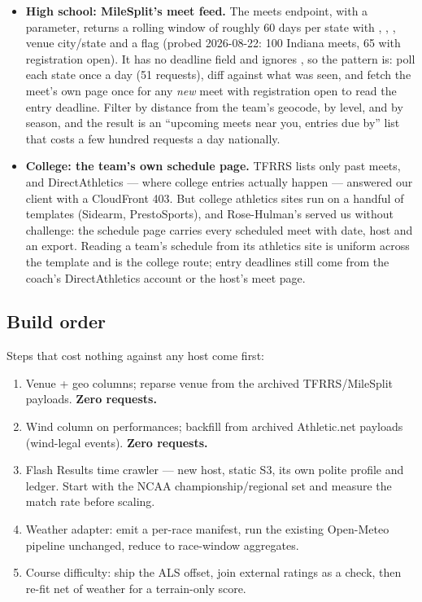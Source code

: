 \begin{itemize}
  \item \textbf{High school: MileSplit's meet feed.} The meets endpoint,
     with a  parameter,
    returns a rolling window of roughly 60 days per state with ,
    , , venue city/state and a
     flag (probed 2026-08-22: 100 Indiana meets,
    65 with registration open). It has no deadline field and ignores
    , so the pattern is: poll each state once a day (51 requests),
    diff against what was seen, and fetch the meet's own page once for any
    \emph{new} meet with registration open to read the entry deadline. Filter
    by distance from the team's geocode, by level, and by season, and the
    result is an ``upcoming meets near you, entries due by'' list that costs
    a few hundred requests a day nationally.
  \item \textbf{College: the team's own schedule page.} TFRRS lists only past
    meets, and DirectAthletics --- where college entries actually happen ---
    answered our client with a CloudFront 403. But college athletics sites run
    on a handful of templates (Sidearm, PrestoSports), and Rose-Hulman's
    served us without challenge: the schedule page carries every scheduled
    meet with date, host and an  export. Reading a team's schedule
    from its athletics site is uniform across the template and is the
    college route; entry deadlines still come from the coach's DirectAthletics
    account or the host's meet page.
\end{itemize}

\subsection{Build order}
Steps that cost nothing against any host come first:
\begin{enumerate}
  \item Venue + geo columns; reparse venue from the archived TFRRS/MileSplit
    payloads. \textbf{Zero requests.}
  \item Wind column on performances; backfill from archived Athletic.net
    payloads (wind-legal events). \textbf{Zero requests.}
  \item Flash Results time crawler --- new host, static S3, its own polite
    profile and ledger. Start with the NCAA championship/regional set and
    measure the match rate before scaling.
  \item Weather adapter: emit a per-race manifest, run the existing
     Open-Meteo pipeline unchanged, reduce to
    race-window aggregates.
  \item Course difficulty: ship the ALS offset, join external ratings as a
    check, then re-fit net of weather for a terrain-only score.
\end{enumerate}

